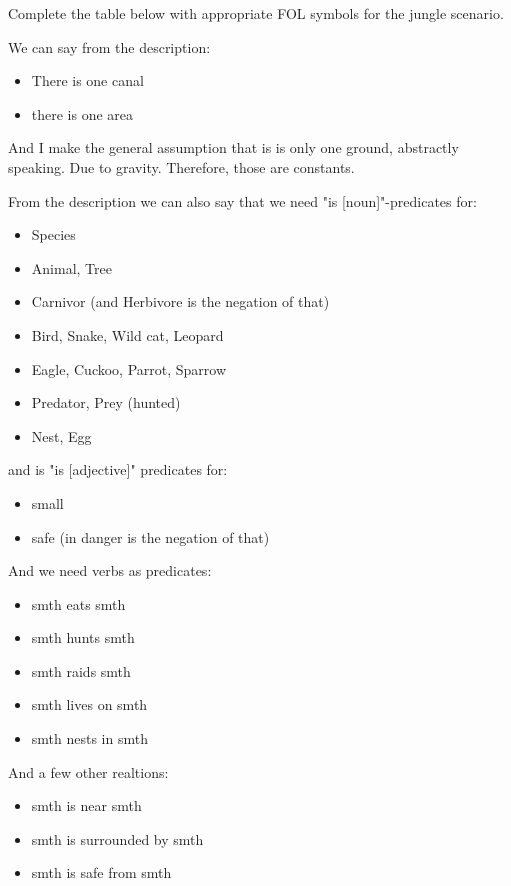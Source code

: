 \documentclass[11pt,a4paper]{article}
\newenvironment{solution}{%
	\begin{tcolorbox}[
		breakable,
		colback=green!4,
		colframe=green!50!black,
		fonttitle=\bfseries,
		title={ Solution},
		left=6pt, right=6pt, top=4pt, bottom=4pt
		]%
	}{%
	\end{tcolorbox}%
}
\begin{document}
Complete the table below with appropriate FOL symbols for the jungle scenario. \\
\begin{solution}
We can say from the description: 
\begin{itemize}
    \item There is one canal 
    \item there is one area 
\end{itemize}
And I make the general assumption that is is only one ground, abstractly speaking. Due to gravity. Therefore, those are constants. 

From the description we can also say that we need "is [noun]"-predicates for: 
\begin{itemize}
    \item Species 
    \item Animal, Tree
    \item Carnivor (and Herbivore is the negation of that)
    \item Bird, Snake, Wild cat, Leopard 
    \item Eagle, Cuckoo, Parrot, Sparrow 
    \item Predator, Prey (hunted)
    \item Nest, Egg
\end{itemize}
and is "is [adjective]" predicates for: 
\begin{itemize}
    \item small
    \item safe (in danger is the negation of that) 
\end{itemize}
And we need verbs as predicates: 
\begin{itemize}
    \item smth eats smth
    \item smth hunts smth
    \item smth raids smth
    \item smth lives on smth
    \item smth nests in smth
    
\end{itemize}
And a few other realtions: 
\begin{itemize}
    \item smth is near smth
     \item smth is surrounded by smth
      \item smth is safe from smth
\end{itemize}
\end{solution}
\end{document}

